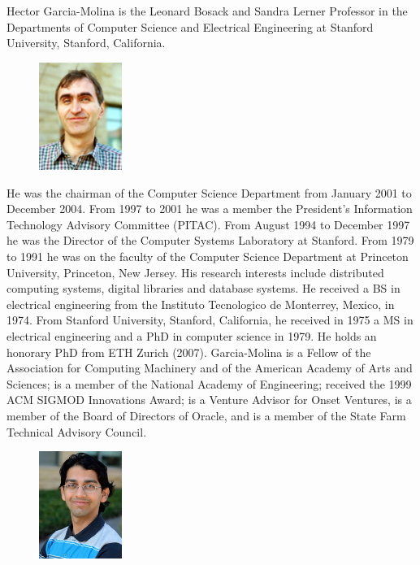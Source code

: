 \documentclass[10pt,journal,compsoc]{IEEEtran}
\begin{document}
Hector Garcia-Molina is the Leonard Bosack and Sandra Lerner Professor in the Departments of Computer Science and Electrical Engineering at Stanford University, Stanford, California. 
\begin{figure}
\includegraphics[height=3.5cm, width=2.7cm]{./figures/hector.pdf}
\end{figure}
He was the chairman of the Computer Science Department from January 2001 to December 2004. From 1997 to 2001 he was a member the President's Information Technology Advisory Committee (PITAC). From August 1994 to December 1997 he was the Director of the Computer Systems Laboratory at Stanford. From 1979 to 1991 he was on the faculty of the Computer Science Department at Princeton University, Princeton, New Jersey. His research interests include distributed computing systems, digital libraries and database systems. He received a BS in electrical engineering from the Instituto Tecnologico de Monterrey, Mexico, in 1974. From Stanford University, Stanford, California, he received in 1975 a MS in electrical engineering and a PhD in computer science in 1979. He holds an honorary PhD from ETH Zurich (2007). Garcia-Molina is a Fellow of the Association for Computing Machinery and of the American Academy of Arts and Sciences; is a member of the National Academy of Engineering; received the 1999 ACM SIGMOD Innovations Award; is a Venture Advisor for Onset Ventures, is a member of the Board of Directors of Oracle, and is a member of the State Farm Technical Advisory Council.
\medskip


\begin{figure}
\includegraphics[height=3.5cm, width=2.7cm]{./figures/Manas.pdf}
\end{figure}
\end{document}
